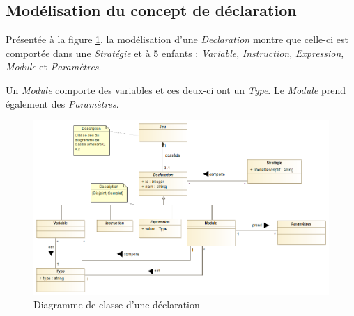 
\subsection{Modélisation du concept de déclaration}
\label{sec:question9}

Présentée à la figure \ref{fig:declaration}, la modélisation d'une \emph{Declaration} montre que celle-ci est comportée dans une \emph{Stratégie} et à 5 enfants : \emph{Variable}, \emph{Instruction}, \emph{Expression}, \emph{Module} et \emph{Paramètres}.

Un \emph{Module} comporte des variables et ces deux-ci ont un \emph{Type}. Le \emph{Module} prend également des \emph{Paramètres}.

\begin{figure}
	\centering
	\includegraphics[width=500pt]{assets/class__Declaration}
	\caption{Diagramme de classe d'une déclaration}
	\label{fig:declaration}
\end{figure}
